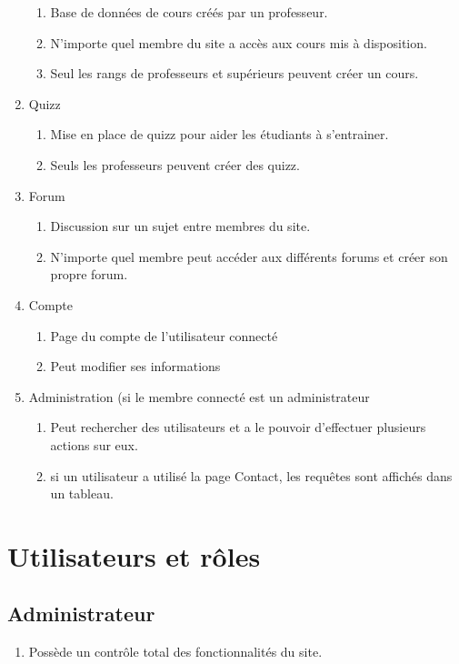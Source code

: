\documentclass[12pt,a4paper]{article}
\begin{document}
\begin{enumerate}
\begin{enumerate}
        \item Base de données de cours créés par un professeur.
        \item N'importe quel membre du site a accès aux cours mis à disposition.
        \item Seul les rangs de professeurs et supérieurs peuvent créer un cours.
    \end{enumerate}
    \item Quizz
    \begin{enumerate}
        \item Mise en place de quizz pour aider les étudiants à s'entrainer.
        \item Seuls les professeurs peuvent créer des quizz.
    \end{enumerate}
    \item Forum
    \begin{enumerate}
        \item Discussion sur un sujet entre membres du site.
        \item N'importe quel membre peut accéder aux différents forums et créer son propre forum.
    \end{enumerate}
    \item Compte
    \begin{enumerate}
        \item Page du compte de l'utilisateur connecté
        \item Peut modifier ses informations
    \end{enumerate}
    \item Administration (si le membre connecté est un administrateur
    \begin{enumerate}
        \item Peut rechercher des utilisateurs et a le pouvoir d'effectuer plusieurs actions sur eux.
        \item si un utilisateur a utilisé la page Contact, les requêtes sont affichés dans un tableau.
    \end{enumerate}
\end{enumerate}

\section{Utilisateurs et rôles}

\subsection{Administrateur}
\begin{enumerate}
    \item Possède un contrôle total des fonctionnalités du site.
\end{enumerate}
\end{document}
